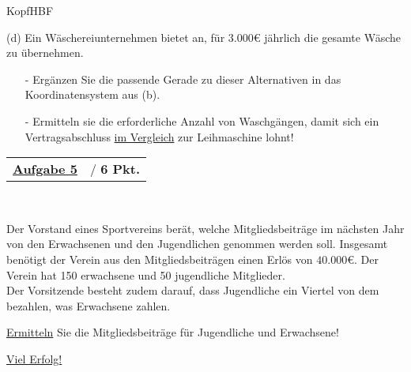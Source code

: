 \documentclass[oneside,openany,headings=optiontotoc,11pt,numbers=noenddot]{scrreprt}
\begin{document}
\begin{test}{0.725}{KopfHBF}
\begin{framed}
			\par\noindent
			(d) Ein Wäschereiunternehmen bietet an, für \(3.000\)\euro{} jährlich die gesamte Wäsche zu übernehmen.\\
			\begin{itemize}
				\item[-] Ergänzen Sie die passende Gerade zu dieser Alternativen in das Koordinatensystem aus (b).
				\item[-] Ermitteln sie die erforderliche Anzahl von Waschgängen, damit sich ein Vertragsabschluss \underline{im Vergleich} zur Leihmaschine lohnt!
			\end{itemize}
		\end{framed}
		\begin{framed}
			\noindent
			\begin{tabularx}{\textwidth}{Xl}\underline{\textbf{Aufgabe 5}}& / \textbf{6 Pkt.}\end{tabularx}\\
			\par\noindent
			Der Vorstand eines Sportvereins berät, welche Mitgliedsbeiträge im nächsten Jahr von den Erwachsenen und den Jugendlichen genommen werden soll. Insgesamt benötigt der Verein aus den Mitgliedsbeiträgen einen Erlös von \(40.000\)\euro{}. Der Verein hat 150 erwachsene und 50 jugendliche Mitglieder.\\
			Der Vorsitzende besteht zudem darauf, dass Jugendliche ein Viertel von dem bezahlen, was Erwachsene zahlen.\\
			\par\noindent
			\underline{Ermitteln} Sie die Mitgliedsbeiträge für Jugendliche und Erwachsene!
		\end{framed}
		\begin{center}
			\Large\underline{Viel Erfolg!}
		\end{center}
	\end{test}
\end{document}
